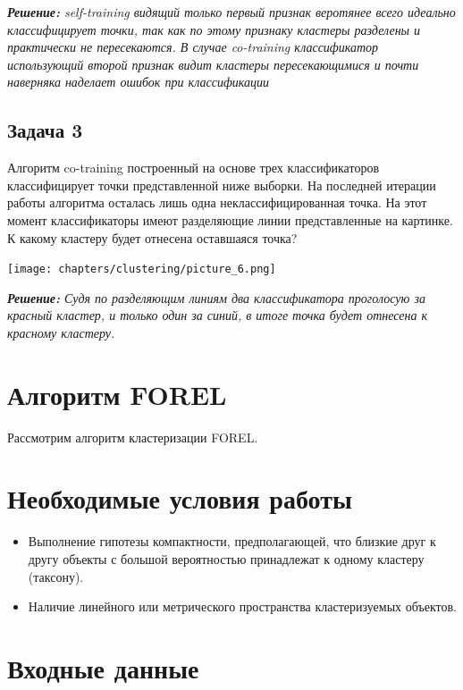 \textit{\textbf{Решение:} self-training видящий только первый признак веротянее всего идеально классифицирует точки, так как по этому признаку кластеры разделены и практически не пересекаются. В случае co-training классификатор использующий второй признак видит кластеры пересекающимися и почти наверняка наделает ошибок при классификации}
\subsection*{Задача 3}
Алгоритм co-training построенный на основе трех классификаторов классифицирует точки представленной ниже выборки. На последней итерации работы алгоритма осталась лишь одна неклассифицированная точка. На этот момент классификаторы имеют разделяющие линии представленные на картинке. К какому кластеру будет отнесена оставшаяся точка?
\begin{center}
\texttt{[image: chapters/clustering/picture\_6.png]}
\end{center}
\textit{\textbf{Решение:} Судя по разделяющим линиям два классификатора проголосую за красный кластер, и только один за синий, в итоге точка будет отнесена к красному кластеру.}

\section{Алгоритм FOREL}
Рассмотрим алгоритм кластеризации FOREL.
\section*{Необходимые условия работы}

\begin{itemize}
    \item Выполнение гипотезы компактности, предполагающей, что близкие друг к другу объекты с большой вероятностью принадлежат к одному кластеру (таксону).
    \item Наличие линейного или метрического пространства кластеризуемых объектов.
\end{itemize}

\section*{Входные данные}

